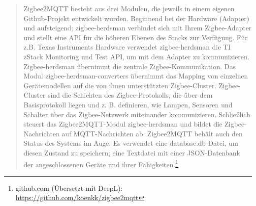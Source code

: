 \begin{quote}
    \color{quotetext}
 		Zigbee2MQTT besteht aus drei Modulen, die jeweils in einem eigenen Github-Projekt entwickelt wurden. Beginnend bei der Hardware (Adapter) und aufsteigend; zigbee-herdsman verbindet sich mit Ihrem Zigbee-Adapter und stellt eine API für die höheren Ebenen des Stacks zur Verfügung. Für z.B. Texas Instruments Hardware verwendet zigbee-herdsman die TI zStack Monitoring und Test API, um mit dem Adapter zu kommunizieren. Zigbee-herdsman übernimmt die zentrale Zigbee-Kommunikation. Das Modul zigbee-herdsman-converters übernimmt das Mapping von einzelnen Gerätemodellen auf die von ihnen unterstützten Zigbee-Cluster. Zigbee-Cluster sind die Schichten des Zigbee-Protokolls, die über dem Basisprotokoll liegen und z. B. definieren, wie Lampen, Sensoren und Schalter über das Zigbee-Netzwerk miteinander kommunizieren. Schließlich steuert das Zigbee2MQTT-Modul zigbee-herdsman und bildet die Zigbee-Nachrichten auf MQTT-Nachrichten ab. Zigbee2MQTT behält auch den Status des Systems im Auge. Es verwendet eine database.db-Datei, um diesen Zustand zu speichern; eine Textdatei mit einer JSON-Datenbank der angeschlossenen Geräte und ihrer Fähigkeiten.\footnote{github.com (Übersetzt mit DeepL): \url{https://github.com/koenkk/zigbee2mqtt}}
\end{quote}